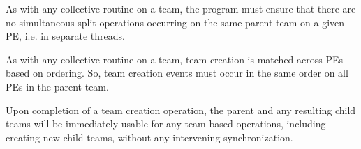 As with any collective routine on a team, the program must ensure that there
are no simultaneous split operations occurring on the same parent team on a
given \ac{PE}, i.e. in separate threads.

As with any collective routine on a team, team creation is matched across PEs based
on ordering. So, team creation events must occur in the same order on all \acp{PE}
in the parent team.

Upon completion of a team creation operation, the parent and any resulting child teams
will be immediately usable for any team-based operations, including creating new child
teams, without any intervening synchronization.
